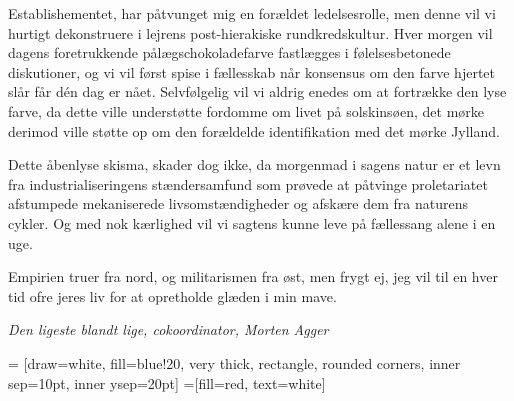 \begin{minipage}[b]{0.95\linewidth}
\begin{minipage}[t]{0.47\textwidth}
Establishementet, har påtvunget mig en forældet ledelsesrolle, men denne vil vi hurtigt dekonstruere i lejrens post-hierakiske rundkredskultur. Hver morgen vil dagens foretrukkende pålægschokoladefarve fastlægges i følelsesbetonede diskutioner, og vi vil først spise i fællesskab når konsensus om den farve hjertet slår får dén dag er nået. Selvfølgelig vil vi aldrig enedes om at fortrække den lyse farve, da dette ville understøtte fordomme om livet på solskinsøen, det mørke derimod ville støtte op om den forældelde identifikation med det mørke Jylland. 

Dette åbenlyse skisma, skader dog ikke, da morgenmad i sagens natur er et levn fra industrialiseringens stændersamfund som prøvede at påtvinge proletariatet afstumpede mekaniserede livsomstændigheder og afskære dem fra naturens cykler. Og med nok kærlighed vil vi sagtens kunne leve på fællessang alene i en uge.

Empirien truer fra nord, og militarismen fra øst, men frygt ej, jeg vil til en hver tid ofre jeres liv for at opretholde glæden i min mave. 

{\flushright\emph{Den ligeste blandt lige, cokoordinator, Morten Agger}}

\end{minipage}
\hfill\begin{minipage}[t]{0.47\textwidth}

\vspace{1mm}
 = [draw=white, fill=blue!20, very thick,
    rectangle, rounded corners, inner sep=10pt, inner ysep=20pt]
 =[fill=red, text=white]

%


\end{minipage}
\end{minipage}
